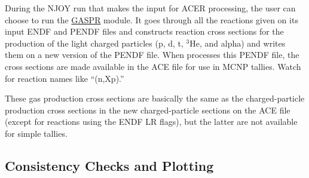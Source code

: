 During the NJOY run that makes the input for ACER processing, the user
can choose to run the \hyperlink{sGASPRhy}{GASPR} module.  It goes
through all the reactions given on its input ENDF and PENDF files and
constructs reaction cross sections for the production of the
light charged particles (p, d, t, $^{3}$He, and alpha) and
writes them on a new version of the PENDF file.  When
 processes this PENDF file, the cross sections are
made available in the ACE file for use in MCNP tallies.  Watch for
reaction names like ``(n,Xp).''

These gas production cross sections are basically the same as the
charged-particle production cross sections in the new charged-particle
sections on the ACE file (except for reactions using the ENDF LR flags),
but the latter are not available for simple tallies.

\subsection{Consistency Checks and Plotting}
\label{ssACER_chk}

